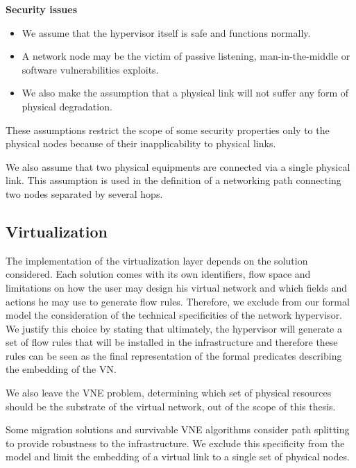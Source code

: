 \textbf{Security issues} 
\begin{itemize}
    \item We assume that the hypervisor itself is safe and functions normally.
    \item A network node may be the victim of passive listening, man-in-the-middle or software vulnerabilities exploits.
    \item We also make the assumption that a physical link will not suffer any form of physical degradation.
\end{itemize}

These assumptions  restrict the scope of some security properties only to the physical nodes because of their inapplicability to physical links.

We also assume that two physical equipments are connected via a single physical link. This assumption is used in the definition of a networking path connecting two nodes separated by several hops.

\subsection{Virtualization}
The implementation of the virtualization layer depends on the solution considered.
Each solution comes with its own identifiers, flow space and limitations on how the user may design his virtual network and which fields and actions he may use to generate flow rules. Therefore, we exclude from our formal model the consideration of the technical specificities of the network hypervisor.
We justify this choice by stating that ultimately, the hypervisor will generate a set of flow rules that will be installed in the infrastructure and therefore these rules can be seen as the final representation of the formal predicates describing the embedding of the VN.

We also leave the VNE problem, \ie determining which set of physical resources should be the substrate of the virtual network, out of the scope of this thesis.

Some migration solutions and survivable VNE algorithms consider path splitting to provide robustness to the infrastructure.
We exclude this specificity from the model and limit the embedding of a virtual link to a single set of physical nodes.
